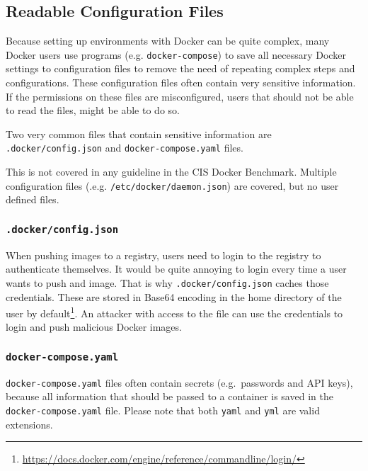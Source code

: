 \subsection{Readable Configuration Files}\label{subsection:config-files}
Because setting up environments with Docker can be quite complex, many Docker users use programs (e.g. \lstinline{docker-compose}) to save all necessary Docker settings to configuration files to remove the need of repeating complex steps and configurations. These configuration files often contain very sensitive information. If the permissions on these files are misconfigured, users that should not be able to read the files, might be able to do so.

Two very common files that contain sensitive information are \lstinline{.docker/config.json} and \lstinline{docker-compose.yaml} files.

\medskip

This is not covered in any guideline in the CIS Docker Benchmark. Multiple configuration files (.e.g. \lstinline{/etc/docker/daemon.json}) are covered, but no user defined files.

\subsubsection{\texorpdfstring{\lstinline{.docker/config.json}}{.docker/config.json}}\label{config-files:docker-config-json}
When pushing images to a registry, users need to login to the registry to authenticate themselves.
It would be quite annoying to login every time a user wants to push and image. That is why \lstinline{.docker/config.json} caches those credentials. These are stored in Base64 encoding in the home directory of the user by default\footnote{\url{https://docs.docker.com/engine/reference/commandline/login/}}. An attacker with access to the file can use the credentials to login and push malicious Docker images\cite{Docker-Credentials-Metasploit}.

\subsubsection{\texorpdfstring{\lstinline{docker-compose.yaml}}{docker-compose.yaml}}
\lstinline{docker-compose.yaml} files often contain secrets (e.g.\ passwords and API keys), because all information that should be passed to a container is saved in the \lstinline{docker-compose.yaml} file. Please note that both \lstinline{yaml} and \lstinline{yml} are valid extensions.
